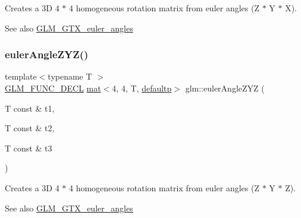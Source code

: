 Creates a 3D 4 $\ast$ 4 homogeneous rotation matrix from euler angles (Z $\ast$ Y $\ast$ X). \begin{DoxySeeAlso}{See also}
\mbox{\hyperlink{group__gtx__euler__angles}{G\+L\+M\+\_\+\+G\+T\+X\+\_\+euler\+\_\+angles}} 
\end{DoxySeeAlso}
\mbox{\label{group__gtx__euler__angles_gacd795f1dbecaf74974f9c76bbcca6830}} 
\subsubsection{\texorpdfstring{euler\+Angle\+Z\+Y\+Z()}{eulerAngleZYZ()}}
{\footnotesize\ttfamily template$<$typename T $>$ \\
\mbox{\hyperlink{setup_8hpp_ab2d052de21a70539923e9bcbf6e83a51}{G\+L\+M\+\_\+\+F\+U\+N\+C\+\_\+\+D\+E\+CL}} \mbox{\hyperlink{structglm_1_1mat}{mat}}$<$4, 4, T, \mbox{\hyperlink{namespaceglm_a36ed105b07c7746804d7fdc7cc90ff25a9d21ccd8b5a009ec7eb7677befc3bf51}{defaultp}}$>$ glm\+::euler\+Angle\+Z\+YZ (\begin{DoxyParamCaption}\item[{T const \&}]{t1,  }\item[{T const \&}]{t2,  }\item[{T const \&}]{t3 }\end{DoxyParamCaption})}

Creates a 3D 4 $\ast$ 4 homogeneous rotation matrix from euler angles (Z $\ast$ Y $\ast$ Z). \begin{DoxySeeAlso}{See also}
\mbox{\hyperlink{group__gtx__euler__angles}{G\+L\+M\+\_\+\+G\+T\+X\+\_\+euler\+\_\+angles}} 
\end{DoxySeeAlso}
\mbox{\label{group__gtx__euler__angles_gaf1077a72171d0f3b08f022ab5ff88af7}} 
